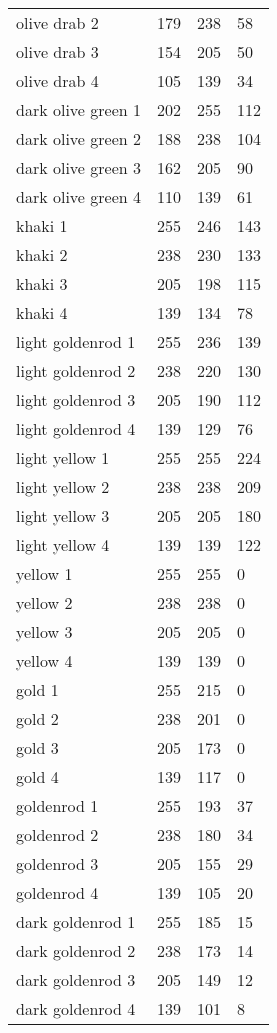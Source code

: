\begin{center}
\begin{tabular}{llll}
  olive drab 2 & 179 & 238 & 58  \\
  olive drab 3 & 154 & 205 & 50  \\
  olive drab 4 & 105 & 139 & 34  \\
  dark olive green 1 & 202 & 255 & 112  \\
  dark olive green 2 & 188 & 238 & 104  \\
  dark olive green 3 & 162 & 205 & 90  \\
  dark olive green 4 & 110 & 139 & 61  \\
  khaki 1 & 255 & 246 & 143  \\
  khaki 2 & 238 & 230 & 133  \\
  khaki 3 & 205 & 198 & 115  \\
  khaki 4 & 139 & 134 & 78  \\
  light goldenrod 1 & 255 & 236 & 139  \\
  light goldenrod 2 & 238 & 220 & 130  \\
  light goldenrod 3 & 205 & 190 & 112  \\
  light goldenrod 4 & 139 & 129 & 76  \\
  light yellow 1 & 255 & 255 & 224  \\
  light yellow 2 & 238 & 238 & 209  \\
  light yellow 3 & 205 & 205 & 180  \\
  light yellow 4 & 139 & 139 & 122  \\
  yellow 1 & 255 & 255 & 0  \\
  yellow 2 & 238 & 238 & 0  \\
  yellow 3 & 205 & 205 & 0  \\
  yellow 4 & 139 & 139 & 0  \\
  gold 1 & 255 & 215 & 0  \\
  gold 2 & 238 & 201 & 0  \\
  gold 3 & 205 & 173 & 0  \\
  gold 4 & 139 & 117 & 0  \\
  goldenrod 1 & 255 & 193 & 37  \\
  goldenrod 2 & 238 & 180 & 34  \\
  goldenrod 3 & 205 & 155 & 29  \\
  goldenrod 4 & 139 & 105 & 20  \\
  dark goldenrod 1 & 255 & 185 & 15  \\
  dark goldenrod 2 & 238 & 173 & 14  \\
  dark goldenrod 3 & 205 & 149 & 12  \\
  dark goldenrod 4 & 139 & 101 & 8  \\

\end{tabular}
\end{center}
